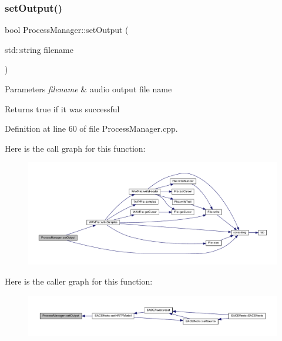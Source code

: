 \subsubsection{\texorpdfstring{set\+Output()}{setOutput()}}
{\footnotesize\ttfamily bool Process\+Manager\+::set\+Output (\begin{DoxyParamCaption}\item[{std\+::string}]{filename }\end{DoxyParamCaption})}


\begin{DoxyParams}{Parameters}
{\em filename} & audio output file name \\
\hline
\end{DoxyParams}
\begin{DoxyReturn}{Returns}
true if it was successful 
\end{DoxyReturn}


Definition at line 60 of file Process\+Manager.\+cpp.

Here is the call graph for this function\+:
\nopagebreak
\begin{figure}[H]
\begin{center}
\leavevmode
\includegraphics[width=350pt]{class_process_manager_aa2deb4f60f83a490ed7520d2ce926626_cgraph}
\end{center}
\end{figure}
Here is the caller graph for this function\+:
\nopagebreak
\begin{figure}[H]
\begin{center}
\leavevmode
\includegraphics[width=350pt]{class_process_manager_aa2deb4f60f83a490ed7520d2ce926626_icgraph}
\end{center}
\end{figure}


